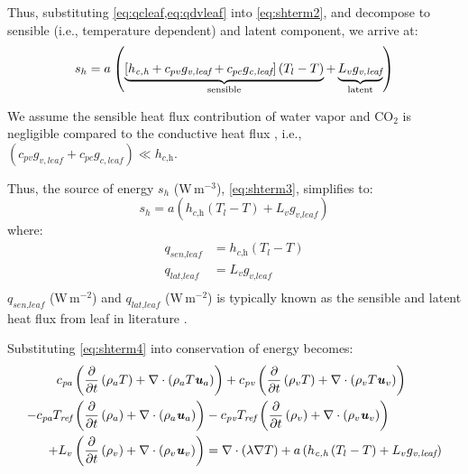 Thus, substituting \cref{eq:qcleaf,eq:qdvleaf} into \cref{eq:shterm2}, and decompose to sensible (i.e., temperature dependent) and latent component, we arrive at:
\begin{equation}
{s_h} = a{\mkern 1mu} \left( {\underbrace {\left[ {{h_{\textit{c,h}}} + {c_{pv}}{g_{\textit{v,leaf}}} + {c_{pc}}{g_{\textit{c,leaf}}}} \right]\left( {{T_l} - T} \right)}_{\mathrm{sensible}} + \underbrace {{L_v}{g_{\textit{v,leaf}}}}_{\mathrm{latent}}} \right)
\label{eq:shterm3}
\end{equation}

\begin{assumption}
We assume the  sensible heat flux contribution of water vapor and CO$_2$ is negligible compared to the conductive heat flux \citep{Hiraoka2005}, i.e., $\left(c_{pv}g_{v,leaf} + c_{pc}g_{c,leaf} \right)\ll h_{\textit{c,h}}$.
\end{assumption}

Thus, the source of energy $s_h$ (W\,m$^{-3}$), \cref{eq:shterm3}, simplifies to:
\begin{equation}
{s_h} = a \left( h_{\textit{c,h}} \left(T_l - T\right) + L_v g_{\textit{v,leaf}} \right)
\label{eq:shterm4}
\end{equation}
where:
\begin{align}
	q_{\textit{sen,leaf}} &= h_{\textit{c,h}} \left(T_l - T\right) \label{eq:qsenleaf2} \\
	q_{\textit{lat,leaf}} &= L_v g_{\textit{v,leaf}} \label{eq:qlatleaf2} \\
\end{align}
$q_{\textit{sen,leaf}}$ (W\,m$^{-2}$) and $q_{\textit{lat,leaf}}$ (W\,m$^{-2}$) is typically known as the sensible and latent heat flux from leaf in literature \citep{Manickathan2018a,Hiraoka2005,Bruse1998}. 


Substituting \cref{eq:shterm4} into conservation of energy becomes:
\begin{equation}
\begin{split}
c_{\textit{pa}}  &\left( \frac{\partial }{\partial t} \left( \rho_a T \right) + \nabla\cdot \left(\rho_a T \textbf{\textit{u}}_a \right)  \right) + c_{\textit{pv}} \left( \frac{\partial }{\partial t} \left( \rho_v T \right) + \nabla \cdot\left(\rho_v T \textbf{\textit{u}}_v \right)  \right) \\ 
- c_{\textit{pa}} T_{\textit{ref}} &\left( \frac{\partial }{\partial t} \left( \rho_a \right) + \nabla \cdot\left(\rho_a \textbf{\textit{u}}_a \right)  \right) - c_{\textit{pv}} T_{\textit{ref}} \left( \frac{\partial }{\partial t} \left( \rho_v \right) + \nabla \cdot\left(\rho_v \textbf{\textit{u}}_v \right)  \right) \\
+ L_v &\left( \frac{\partial }{\partial t} \left( \rho_v \right) + \nabla\cdot \left(\rho_v \textbf{\textit{u}}_v \right)  \right) =  \nabla  \cdot \left(\lambda \nabla T \right) + a \left( h_{\textit{c,h}} \left(T_l - T\right) + L_v g_{\textit{v,leaf}} \right)
\end{split}
\label{eq:energy8}
\end{equation}

